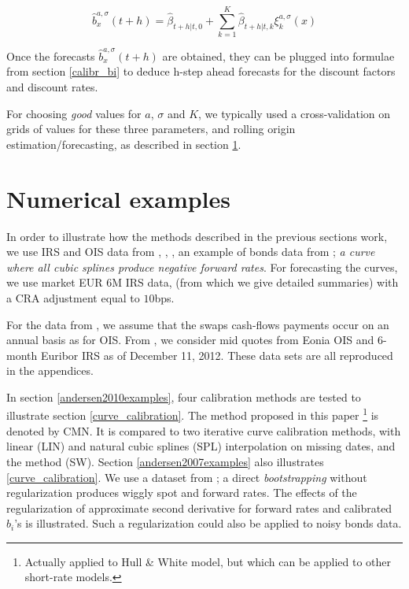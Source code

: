 \begin{equation}
\hat{b}^{a, \sigma}_{x}(t+h) = \hat{\beta}_{t+h|t, 0} + \sum_{k = 1}^K \hat{\beta}_{t+h|t, k} \xi^{a, \sigma}_k(x)
\end{equation}

\medskip

Once the forecasts $\hat{b}^{a, \sigma}_{x}(t+h)$ are obtained, they can be plugged into formulae from section \ref{calibr_bi} to deduce h-step ahead forecasts for the discount factors and discount rates.

\medskip

For choosing \textit{good} values for $a$, $\sigma$ and $K$, we typically used a cross-validation on grids of values for these three parameters, and rolling origin estimation/forecasting, as described in section \ref{numericalexamples}.

\section{Numerical examples}
\label{numericalexamples}

In order to illustrate how the methods described in the previous sections work, we use IRS and OIS data from \cite{andersen2007discount}, \cite{andersen2010interest}, \cite{ametrano2013everything}, an example of bonds data from \cite{hagan2006interpolation}; \textit{a curve where all cubic splines produce negative forward rates}. For forecasting the curves, we use market EUR 6M IRS data, (from which we give detailed summaries) with a CRA adjustment equal to $10$bps.

\medskip

For the data from \cite{andersen2010interest}, we assume that the swaps cash-flows payments occur on an annual basis as for OIS. From \cite{ametrano2013everything}, we consider mid quotes from Eonia OIS and 6-month Euribor IRS as of December 11, 2012. These data sets are all reproduced in the appendices.

\medskip

In section \ref{andersen2010examples}, four calibration methods are tested to illustrate section \ref{curve_calibration}. The method proposed in this paper \footnote{Actually applied to Hull \& White model, but which can be applied to other short-rate models.} is denoted by CMN. It is compared to two iterative curve calibration methods, with linear (LIN) and natural cubic splines (SPL) interpolation on missing dates, and the \cite{smithwilson2001} method (SW). Section \ref{andersen2007examples} also illustrates \ref{curve_calibration}. We use a dataset from \cite{andersen2007discount}; a direct \textit{bootstrapping} without regularization produces wiggly spot and forward rates. The effects of the regularization of approximate second derivative for forward rates and calibrated $b_i$'s is illustrated. Such a regularization could also be applied to noisy bonds data.

